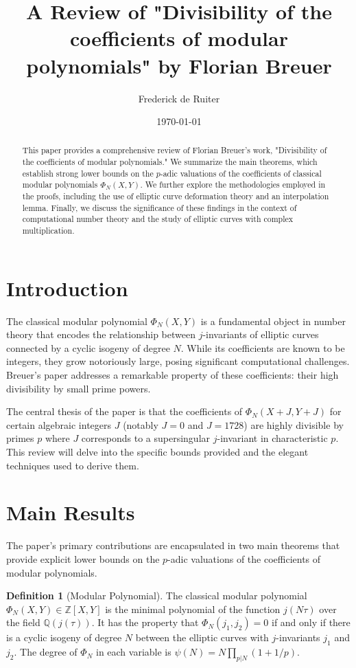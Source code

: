 \documentclass[12pt, a4paper]{article}
\title{A Review of "Divisibility of the coefficients of modular polynomials" by Florian Breuer}
\author{Frederick de Ruiter}
\date{\today}
\theoremstyle{plain}
\theoremstyle{definition}
\newtheorem{definition}[theorem]{Definition}
\newcommand{\Q}{\mathbb{Q}}
\newcommand{\Z}{\mathbb{Z}}
\begin{document}
\maketitle

\begin{abstract}
    This paper provides a comprehensive review of Florian Breuer's work, "Divisibility of the coefficients of modular polynomials." We summarize the main theorems, which establish strong lower bounds on the $p$-adic valuations of the coefficients of classical modular polynomials $\Phi_N(X,Y)$. We further explore the methodologies employed in the proofs, including the use of elliptic curve deformation theory and an interpolation lemma. Finally, we discuss the significance of these findings in the context of computational number theory and the study of elliptic curves with complex multiplication.
\end{abstract}

\section{Introduction}

The classical modular polynomial $\Phi_N(X,Y)$ is a fundamental object in number theory that encodes the relationship between $j$-invariants of elliptic curves connected by a cyclic isogeny of degree $N$. While its coefficients are known to be integers, they grow notoriously large, posing significant computational challenges. Breuer's paper addresses a remarkable property of these coefficients: their high divisibility by small prime powers.

The central thesis of the paper is that the coefficients of $\Phi_N(X+J, Y+J)$ for certain algebraic integers $J$ (notably $J=0$ and $J=1728$) are highly divisible by primes $p$ where $J$ corresponds to a supersingular $j$-invariant in characteristic $p$. This review will delve into the specific bounds provided and the elegant techniques used to derive them.

\section{Main Results}

The paper's primary contributions are encapsulated in two main theorems that provide explicit lower bounds on the $p$-adic valuations of the coefficients of modular polynomials.

\begin{definition}[Modular Polynomial]
The classical modular polynomial $\Phi_N(X,Y) \in \Z[X,Y]$ is the minimal polynomial of the function $j(N\tau)$ over the field $\Q(j(\tau))$. It has the property that $\Phi_N(j_1, j_2) = 0$ if and only if there is a cyclic isogeny of degree $N$ between the elliptic curves with $j$-invariants $j_1$ and $j_2$. The degree of $\Phi_N$ in each variable is $\psi(N) = N \prod_{p|N}(1+1/p)$.
\end{definition}
\end{document}
